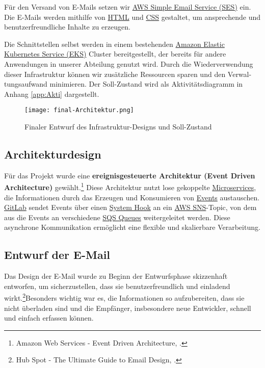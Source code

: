 Für den Versand von E-Mails setzen wir \hyperlink{SES}{\textcolor{AOBlau}{AWS Simple Email Service (SES)}} ein. Die E-Mails werden mithilfe von \hyperlink{HTML}{\textcolor{AOBlau}{HTML}} und \hyperlink{CSS}{\textcolor{AOBlau}{CSS}} gestaltet, um ansprechende und benutzerfreundliche Inhalte zu erzeugen.

Die Schnittstellen selbst werden in einem bestehenden \hyperlink{EKS}{\textcolor{AOBlau}{Amazon Elastic Kubernetes Service (EKS)}} Cluster bereitgestellt, der bereits für andere Anwendungen in unserer Abteilung genutzt wird. Durch die Wiederverwendung dieser Infrastruktur können wir zusätzliche Ressourcen sparen und den Verwal-
tungsaufwand minimieren. Der Soll-Zustand wird als Aktivitätsdiagramm in Anhang \ref{app:Akti} dargestellt.
\clearpage

\begin{figure}[h!]
	\centering
	\texttt{[image: final-Architektur.png]}
	\caption{Finaler Entwurf des Infrastruktur-Designs und Soll-Zustand}
\end{figure}

\subsection{Architekturdesign}
\label{sec:Architekturdesign}

Für das Projekt wurde eine \textbf{ereignisgesteuerte Architektur (Event Driven Architecture)} gewählt.\footnote{Amazon Web Services - Event Driven Architecture, \cite{awsEDA}.} Diese Architektur nutzt lose gekoppelte \hyperlink{Microservices}{\textcolor{AOBlau}{Microservices}}, die Informationen durch das Erzeugen und Konsumieren von \hyperlink{GitLabEvent}{\textcolor{AOBlau}{Events}} austauschen. \hyperlink{GitLab}{\textcolor{AOBlau}{GitLab}} sendet Events über einen \hyperlink{GitLabSystemhooks}{\textcolor{AOBlau}{System Hook}} an ein \hyperlink{SNS}{\textcolor{AOBlau}{AWS SNS}}-Topic, von dem aus die Events an verschiedene \hyperlink{SQS}{\textcolor{AOBlau}{SQS Queues}} weitergeleitet werden. Diese asynchrone Kommunikation ermöglicht eine flexible und skalierbare Verarbeitung.

\subsection{Entwurf der E-Mail}
\label{sec:Benutzeroberflaeche}

Das Design der E-Mail wurde zu Beginn der Entwurfsphase skizzenhaft entworfen, um sicherzustellen, dass sie benutzerfreundlich und einladend wirkt.\footnote{Hub Spot - The Ultimate Guide to Email Design, \cite{HubSpot}.}Besonders wichtig war es, die Informationen so aufzubereiten, dass sie nicht überladen sind und die Empfänger, insbesondere neue Entwickler, schnell und einfach erfassen können. 

